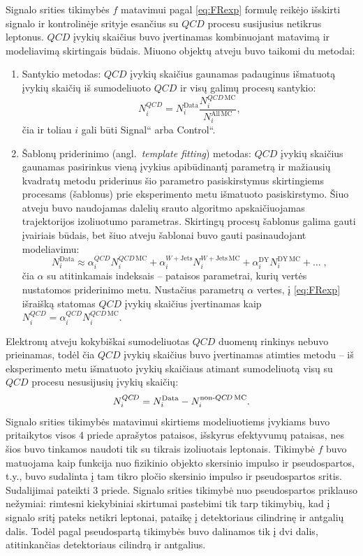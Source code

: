 \documentclass[a4paper, 12pt, oneside]{article}
\newcommand{\WJets}{W\! +\!\mathrm{Jets}}
\newcommand{\ltq}[1]{{\quotedblbase{}#1\textquotedblleft{}}}
\newcommand{\QCD}{QC\! D}
\newlength\q
\begin{document}
Signalo srities tikimybės $f$ matavimui pagal \eqref{eq:FRexp} formulę reikėjo išskirti signalo ir kontrolinėje srityje esančius
su $\QCD$ procesu susijusius netikrus leptonus.
$\QCD$ įvykių skaičius buvo įvertinamas kombinuojant matavimą ir modeliavimą skirtingais būdais.
Miuono objektų atveju buvo taikomi du metodai:
\begin{enumerate}
	\item Santykio metodas: $\QCD$ įvykių skaičius gaunamas padauginus išmatuotą įvykių skaičių iš sumodeliuoto $\QCD$ ir visų
	galimų procesų santykio:
	\begin{equation}
		N_i^{\QCD}=N_i^{\mathrm{Data}} \frac{N_i^{\QCD \, \mathrm{MC}}}{N_i^{\mathrm{All \, MC}}},
	\end{equation}
	čia ir toliau $i$ gali būti \ltq{Signal} arba \ltq{Control}.
	\item Šablonų priderinimo (angl.\ \textit{template fitting}) metodas: $\QCD$ įvykių skaičius gaunamas pasirinkus vieną
	įvykius apibūdinantį parametrą ir mažiausių kvadratų metodu priderinus šio parametro pasiskirstymus skirtingiems procesams
	(šablonus) prie eksperimento metu išmatuoto pasiskirstymo.
	Šiuo atveju buvo naudojamas dalelių srauto algoritmo apskaičiuojamas trajektorijos izoliuotumo parametras.
	Skirtingų procesų šablonus galima gauti įvairiais būdais, bet šiuo atveju šablonai buvo gauti pasinaudojant modeliavimu:
	\begin{equation}
		N_i^{\mathrm{Data}} \approx \alpha_i^{\QCD} N_i^{\QCD \, \mathrm{MC}} + \alpha_i^{\WJets} N_i^{\WJets \, \mathrm{MC}} +
		\alpha_i^{\mathrm{DY}} N_i^{\mathrm{DY \, MC}} + \dots \;,
	\end{equation}		
	čia $\alpha$ su atitinkamais indeksais -- pataisos parametrai, kurių vertės nustatomos priderinimo metu.
	Nustačius parametrų $\alpha$ vertes, į \eqref{eq:FRexp} išraišką statomas $\QCD$ įvykių skaičius įvertinamas kaip
	$N_i^{\QCD} = \alpha_i^{\QCD} N_i^{\QCD \, \mathrm{MC}}$.
\end{enumerate}

Elektronų atveju kokybiškai sumodeliuotas $\QCD$ duomenų rinkinys nebuvo prieinamas, todėl čia $\QCD$ įvykių skaičius buvo
įvertinamas atimties metodu -- iš eksperimento metu išmatuoto įvykių skaičiaus atimant sumodeliuotą visų su $\QCD$ procesu
nesusijusių įvykių skaičių:
\begin{equation}
	N_i^{\QCD} = N_i^{\mathrm{Data}} - N_i^{\mathrm{non}{\text -}\QCD \, \mathrm{MC}}.
\end{equation}
Signalo srities tikimybės matavimui skirtiems modeliuotiems įvykiams buvo pritaikytos visos 4 priede aprašytos pataisos,
išskyrus efektyvumų pataisas, nes šios buvo tinkamos naudoti tik su tikrais izoliuotais leptonais.
Tikimybė $f$ buvo matuojama kaip funkcija nuo fizikinio objekto skersinio impulso ir pseudospartos,
t.y., buvo sudalinta į tam tikro pločio skersinio impulso ir pseudospartos sritis.
Sudalijimai pateikti 3 priede.
Signalo srities tikimybė nuo pseudospartos priklauso nežymiai: rimtesni kiekybiniai skirtumai pastebimi tik
tarp tikimybių, kad į signalo sritį pateks netikri leptonai, pataikę į detektoriaus cilindrinę ir antgalių dalis.
Todėl pagal pseudospartą tikimybės buvo dalinamos tik į dvi dalis, atitinkančias detektoriaus cilindrą ir antgalius.
\end{document}
